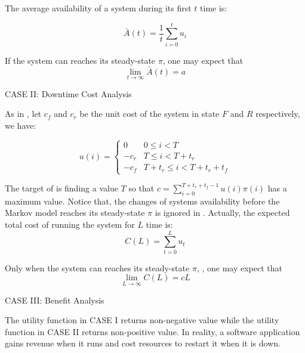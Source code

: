 The average availability of a system during its first $t$ time is:

\begin{equation}
\label{discrete_availability_average}
\bar{A}(t) = \frac{1}{ t }\sum \limits_{i=0}^{t} u_i
\end{equation}

If the system can reaches its steady-state $\pi$, one may expect that 
\begin{equation}
  \lim_{t\rightarrow \infty}{\bar{A}(t)} = a
\end{equation}

CASE II: Downtime Cost Analysis

As in \citep{huang1995software}, let $c_f$ and $c_r$ be the unit cost 
of the system in state $F$ and $R$ respectively, we have:

\begin{equation}
\label{discrete_downtime_utiliy}
u(i) =  \begin{cases}   0 & 0 \leq i < T \\
                       -c_r & T \leq i < T + t_r \\
                       -c_f & T + t_r \leq i < T + t_r + t_f
        \end{cases}
\end{equation}

The target of \citep{huang1995software} is finding a value $T$ so that
$c = \sum \limits_{i=0}^{T+t_r+t_f-1} u(i)\pi(i) $ has a maximum value.
Notice that, the changes of systems availability before the Markov model 
reaches its steady-state $\pi$ is ignored in \citep{dohi2000statistical}.
Actually, the expected total cost of running the system for $L$ time is:
\begin{equation}
\label{discrete_availability_total}
C(L) = \sum \limits_{t=0}^{L} u_t
\end{equation}

Only when the system can reaches its steady-state $\pi$, , one may expect 
that 
\begin{equation}
  \lim_{L\rightarrow \infty}{C(L)} = cL
\end{equation}

\newpage

CASE III: Benefit Analysis

The utility function in CASE I returns non-negative value while the utility 
function in CASE II returns non-positive value.  In reality, a software 
application gains revenue when it runs and cost resources to restart it when it 
is down.


